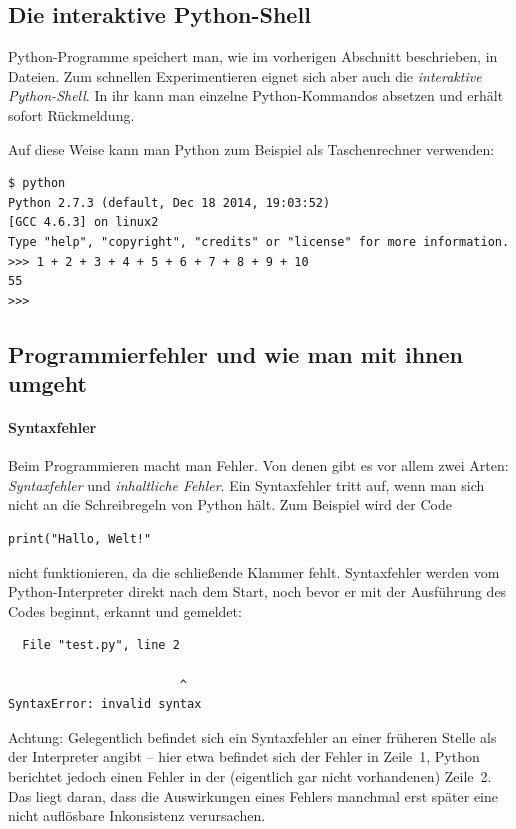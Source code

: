 \documentclass{blatt}
\begin{document}
\subsection{Die interaktive Python-Shell}

Python-Programme speichert man, wie im vorherigen Abschnitt beschrieben, in
Dateien. Zum schnellen Experimentieren eignet sich aber auch die
\emph{interaktive Python-Shell}. In ihr kann man einzelne Python-Kommandos
absetzen und erhält sofort Rückmeldung.

Auf diese Weise kann man Python zum Beispiel als Taschenrechner verwenden:
\begin{verbatim}
$ python
Python 2.7.3 (default, Dec 18 2014, 19:03:52)
[GCC 4.6.3] on linux2
Type "help", "copyright", "credits" or "license" for more information.
>>> 1 + 2 + 3 + 4 + 5 + 6 + 7 + 8 + 9 + 10
55
>>>
\end{verbatim}



\subsection{Programmierfehler und wie man mit ihnen umgeht}

\paragraph{Syntaxfehler}
Beim Programmieren macht man Fehler. Von denen gibt es vor allem zwei Arten:
\emph{Syntaxfehler} und \emph{inhaltliche Fehler}. Ein Syntaxfehler tritt auf,
wenn man sich nicht an die Schreibregeln von Python hält. Zum Beispiel wird der
Code
\begin{verbatim}
print("Hallo, Welt!"
\end{verbatim}
nicht funktionieren, da die schließende Klammer fehlt. Syntaxfehler werden vom
Python-In\-ter\-pre\-ter direkt nach dem Start, noch bevor er mit der Ausführung des
Codes beginnt, erkannt und gemeldet:
\begin{verbatim}
  File "test.py", line 2

                        ^
SyntaxError: invalid syntax
\end{verbatim}
Achtung: Gelegentlich befindet sich ein Syntaxfehler an einer früheren Stelle
als der Interpreter angibt -- hier etwa befindet sich der Fehler in Zeile~1,
Python berichtet jedoch einen Fehler in der (eigentlich gar nicht vorhandenen)
Zeile~2. Das liegt daran, dass die Auswirkungen eines
Fehlers manchmal erst später eine nicht auflösbare Inkonsistenz verursachen.
\end{document}
